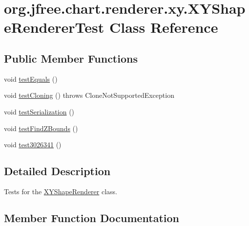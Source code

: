 \hypertarget{classorg_1_1jfree_1_1chart_1_1renderer_1_1xy_1_1_x_y_shape_renderer_test}{}\section{org.\+jfree.\+chart.\+renderer.\+xy.\+X\+Y\+Shape\+Renderer\+Test Class Reference}
\label{classorg_1_1jfree_1_1chart_1_1renderer_1_1xy_1_1_x_y_shape_renderer_test}
\subsection*{Public Member Functions}
\begin{DoxyCompactItemize}
\item 
void \mbox{\hyperlink{classorg_1_1jfree_1_1chart_1_1renderer_1_1xy_1_1_x_y_shape_renderer_test_a03ea3fc5e119bf31f0d4d657bb28ceb0}{test\+Equals}} ()
\item 
void \mbox{\hyperlink{classorg_1_1jfree_1_1chart_1_1renderer_1_1xy_1_1_x_y_shape_renderer_test_a18de1ccf6dba406fe29715908fab6ae5}{test\+Cloning}} ()  throws Clone\+Not\+Supported\+Exception 
\item 
void \mbox{\hyperlink{classorg_1_1jfree_1_1chart_1_1renderer_1_1xy_1_1_x_y_shape_renderer_test_a16ff4ee9da4bd77be6401dbb587d51e7}{test\+Serialization}} ()
\item 
void \mbox{\hyperlink{classorg_1_1jfree_1_1chart_1_1renderer_1_1xy_1_1_x_y_shape_renderer_test_a3d4a112504195a637049f41abc972a5a}{test\+Find\+Z\+Bounds}} ()
\item 
void \mbox{\hyperlink{classorg_1_1jfree_1_1chart_1_1renderer_1_1xy_1_1_x_y_shape_renderer_test_aa0a5decf55395ab0cbf1ed943e4b4650}{test3026341}} ()
\end{DoxyCompactItemize}


\subsection{Detailed Description}
Tests for the \mbox{\hyperlink{classorg_1_1jfree_1_1chart_1_1renderer_1_1xy_1_1_x_y_shape_renderer}{X\+Y\+Shape\+Renderer}} class. 

\subsection{Member Function Documentation}
\mbox{\label{classorg_1_1jfree_1_1chart_1_1renderer_1_1xy_1_1_x_y_shape_renderer_test_aa0a5decf55395ab0cbf1ed943e4b4650}} 
